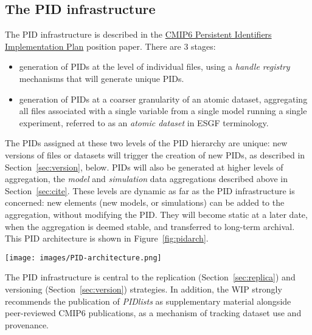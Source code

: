 \documentclass[gmd,manuscript]{copernicus}
\newcommand{\figref}[1] {\mbox{Figure   \ref{fig:#1}}}
\newcommand{\secref}[1] {\mbox{Section  \ref{sec:#1}}}
\begin{document}
\subsection{The PID infrastructure}
\label{sec:pid}

The PID infrastructure is described in the
\href{https://goo.gl/dQAEDy}{CMIP6 Persistent Identifiers
  Implementation Plan} position paper. There are 3 stages:

\begin{itemize}
\item generation of PIDs at the level of individual files, using a
  \emph{handle registry} mechanisms that will generate unique PIDs.
\item generation of PIDs at a coarser granularity of an atomic
  dataset, aggregating all files associated with a single variable from a
  single model running a single experiment, referred to as an
  \emph{atomic dataset} in ESGF terminology.
\end{itemize}

The PIDs assigned at these two levels of the PID hierarchy are unique:
new versions of files or datasets will trigger the creation of new
PIDs, as described in \secref{version}, below. PIDs will also be
generated at higher levels of aggregation, the \emph{model} and
\emph{simulation} data aggregations described above in \secref{cite}.
These levels are dynamic as far as the PID infrastructure is
concerned: new elements (new models, or simulations) can be added to
the aggregation, without modifying the PID. They will become static at
a later date, when the aggregation is deemed stable, and transferred
to long-term archival. This PID architecture is shown in
\figref{pidarch}.


\begin{figure*}
  \begin{center}
    \texttt{[image: images/PID-architecture.png]}
  \end{center}
  \caption{PID architecture, showing layers in the PID hierarchy. In
    the lower layers of the hierarchy, PIDs are static once generated,
    and new datasets generate new versions with new PIDs. Figure
    courtesy Tobias Weigel.}
  \label{fig:pidarch}
\end{figure*}

The PID infrastructure is central to the replication
(\secref{replica}) and versioning (\secref{version}) strategies. In
addition, the WIP strongly recommends the publication of
\emph{PIDlists} as supplementary material alongside peer-reviewed
CMIP6 publications, as a mechanism of tracking dataset use and
provenance.
\end{document}
